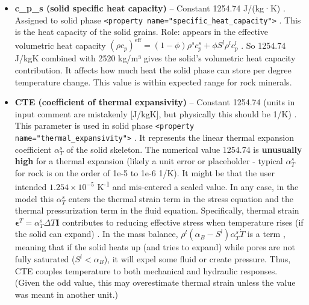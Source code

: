 \documentclass[10pt,a4paper]{article}
\begin{document}
\begin{itemize}
    \item \textbf{c\_p\_s (solid specific heat capacity)} – Constant 1254.74 J/(kg·K) \cite{file:03_parameters_TRM}. Assigned to solid phase \texttt{<property name="specific\_heat\_capacity">} \cite{file:04_media_TRM}. This is the heat capacity of the solid grains. Role: appears in the effective volumetric heat capacity $(\rho c_p)^{\text{eff}} = (1-\phi)\rho^s c_p^s + \phi S^l \rho^l c_p^l$ \cite{ogs:trm}. So 1254.74 J/kgK combined with 2520 kg/m³ gives the solid's volumetric heat capacity contribution. It affects how much heat the solid phase can store per degree temperature change. This value is within expected range for rock minerals.

    \item \textbf{CTE (coefficient of thermal expansivity)} – Constant 1254.74 (units in input comment are mistakenly [J/kgK], but physically this should be 1/K) \cite{file:03_parameters_TRM}. This parameter is used in solid phase \texttt{<property name="thermal\_expansivity">} \cite{file:04_media_TRM}. It represents the linear thermal expansion coefficient $\alpha_T^s$ of the solid skeleton. The numerical value 1254.74 is \textbf{unusually high} for a thermal expansion (likely a unit error or placeholder - typical $\alpha_T^s$ for rock is on the order of 1e-5 to 1e-6 1/K). It might be that the user intended $1.254\times10^{-5}$ K\textsuperscript{-1} and mis-entered a scaled value. In any case, in the model this $\alpha_T^s$ enters the thermal strain term in the stress equation and the thermal pressurization term in the fluid equation. Specifically, thermal strain $\boldsymbol{\epsilon}^T = \alpha_T^s \Delta T \mathbf{I}$ contributes to reducing effective stress when temperature rises (if the solid can expand) \cite{ogs:trm}. In the mass balance, $\rho^l(\alpha_B - S^l)\alpha_T^s \dot{T}$ is a term \cite{ogs:trm}, meaning that if the solid heats up (and tries to expand) while pores are not fully saturated ($S^l < \alpha_B$), it will expel some fluid or create pressure. Thus, CTE couples temperature to both mechanical and hydraulic responses. (Given the odd value, this may overestimate thermal strain unless the value was meant in another unit.)


\end{itemize}
\end{document}
